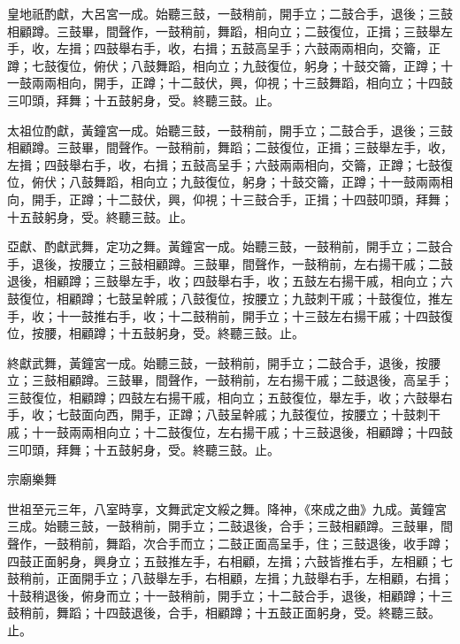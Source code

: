 \begin{pinyinscope}
 皇地祇酌獻，大呂宮一成。始聽三鼓，一鼓稍前，開手立；二鼓合手，退後；三鼓相顧蹲。三鼓畢，間聲作，一鼓稍前，舞蹈，相向立；二鼓復位，正揖；三鼓舉左手，收，左揖；四鼓舉右手，收，右揖；五鼓高呈手；六鼓兩兩相向，交籥，正蹲；七鼓復位，俯伏；八鼓舞蹈，相向立；九鼓復位，躬身；十鼓交籥，正蹲；十一鼓兩兩相向，開手，正蹲；十二鼓伏，興，仰視；十三鼓舞蹈，相向立；十四鼓三叩頭，拜舞；十五鼓躬身，受。終聽三鼓。止。



 太祖位酌獻，黃鐘宮一成。始聽三鼓，一鼓稍前，開手立；二鼓合手，退後；三鼓相顧蹲。三鼓畢，間聲作。一鼓稍前，舞蹈；二鼓復位，正揖；三鼓舉左手，收，左揖；四鼓舉右手，收，右揖；五鼓高呈手；六鼓兩兩相向，交籥，正蹲；七鼓復位，俯伏；八鼓舞蹈，相向立；九鼓復位，躬身；十鼓交籥，正蹲；十一鼓兩兩相向，開手，正蹲；十二鼓伏，興，仰視；十三鼓合手，正揖；十四鼓叩頭，拜舞；十五鼓躬身，受。終聽三鼓。止。



 亞獻、酌獻武舞，定功之舞。黃鐘宮一成。始聽三鼓，一鼓稍前，開手立；二鼓合手，退後，按腰立；三鼓相顧蹲。三鼓畢，間聲作，一鼓稍前，左右揚干戚；二鼓退後，相顧蹲；三鼓舉左手，收；四鼓舉右手，收；五鼓左右揚干戚，相向立；六鼓復位，相顧蹲；七鼓呈幹戚；八鼓復位，按腰立；九鼓刺干戚；十鼓復位，推左手，收；十一鼓推右手，收；十二鼓稍前，開手立；十三鼓左右揚干戚；十四鼓復位，按腰，相顧蹲；十五鼓躬身，受。終聽三鼓。止。



 終獻武舞，黃鐘宮一成。始聽三鼓，一鼓稍前，開手立；二鼓合手，退後，按腰立；三鼓相顧蹲。三鼓畢，間聲作，一鼓稍前，左右揚干戚；二鼓退後，高呈手；三鼓復位，相顧蹲；四鼓左右揚干戚，相向立；五鼓復位，舉左手，收；六鼓舉右手，收；七鼓面向西，開手，正蹲；八鼓呈幹戚；九鼓復位，按腰立；十鼓刺干戚；十一鼓兩兩相向立；十二鼓復位，左右揚干戚；十三鼓退後，相顧蹲；十四鼓三叩頭，拜舞；十五鼓躬身，受。終聽三鼓。止。



 宗廟樂舞



 世祖至元三年，八室時享，文舞武定文綏之舞。降神，《來成之曲》九成。黃鐘宮三成。始聽三鼓，一鼓稍前，開手立；二鼓退後，合手；三鼓相顧蹲。三鼓畢，間聲作，一鼓稍前，舞蹈，次合手而立；二鼓正面高呈手，住；三鼓退後，收手蹲；四鼓正面躬身，興身立；五鼓推左手，右相顧，左揖；六鼓皆推右手，左相顧；七鼓稍前，正面開手立；八鼓舉左手，右相顧，左揖；九鼓舉右手，左相顧，右揖；十鼓稍退後，俯身而立；十一鼓稍前，開手立；十二鼓合手，退後，相顧蹲；十三鼓稍前，舞蹈；十四鼓退後，合手，相顧蹲；十五鼓正面躬身，受。終聽三鼓。止。




\end{pinyinscope}
